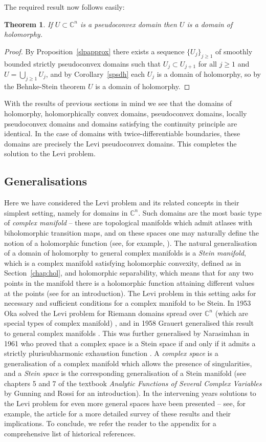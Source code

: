 \documentclass[11pt,a4paper, final, twoside]{article}
\newtheorem{theorem}{Theorem}
\numberwithin{equation}{section}
\newcommand{\C}{\mathbb C}
\begin{document}
The required result now follows easily:
\begin{theorem}
If $U\subset\C^n$ is a pseudoconvex domain then $U$ is a domain of holomorphy.
\end{theorem}
\begin{proof}
By Proposition~\ref{slpapprox} there exists a sequence $\{U_j\}_{j\geq 1}$ of smoothly bounded strictly pseudoconvex domains 
such that $U_j\subset U_{j+1}$ for all $j\geq 1$ and $U=\bigcup_{j\geq 1}U_j$, and by Corollary~\ref{spsdh} each $U_j$ is a domain of holomorphy, so by the Behnke-Stein theorem $U$ is a domain
of holomorphy.
\end{proof}
With the results of previous sections in mind we see that the domains of holomorphy, holomorphically convex domains, 
pseudoconvex domains,
locally pseudoconvex domains and domains satisfying the continuity principle are
identical. In the case of domains with twice-differentiable boundaries, these domains are precisely the Levi pseudoconvex domains. This completes the solution to the Levi problem.
\subsection{Generalisations}
\label{sec:concl}
Here we have considered the Levi problem and its related concepts 
in their simplest setting, namely for domains in $\C^n$. Such domains are the most basic type of \emph{complex manifold} -- these are
topological manifolds which admit atlases with biholomorphic transition maps, and on these spaces one may naturally define the notion of a holomorphic function
(see, for example, \cite[subsection 12]{itca}). The natural generalisation of a domain
of holomorphy to general complex manifolds is a \emph{Stein manifold}, which is a complex manifold satisfying holomorphic convexity, defined as in Section~\ref{chap:hol}, and
holomorphic separability, which means that for any two points in the manifold there is a holomorphic function attaining different values at the points (see \cite[page 223]{itca}
for an introduction).
The Levi problem
in this setting asks for necessary and sufficient conditions for a complex manifold to be Stein. In 1953 Oka solved the Levi problem for Riemann domains spread over $\C^n$ (which are special
types of complex manifold) \cite{oka}, and in 1958 Grauert generalised this result to general complex manifolds \cite{grauert58}.  
This was further generalised by Narasimhan in 1961 who proved that a complex space is a Stein space if and only if it admits a strictly plurisubharmonic exhaustion function \cite{narasimhan}. 
A \emph{complex space} is a generalisation of a complex manifold which allows the presence of singularities, and a \emph{Stein space} is the corresponding generalisation of a Stein manifold (see
chapters 5 and 7 of
the textbook \emph{Analytic Functions of Several Complex Variables} by Gunning and Rossi \cite{gunning} for an introduction). In the intervening years solutions to the Levi problem
for even more general spaces have been presented -- see, for example, the article \cite{siu} for a more detailed survey of these results and their implications. To conclude, we refer the reader to the appendix for a comprehensive list of historical references. 
\end{document}
